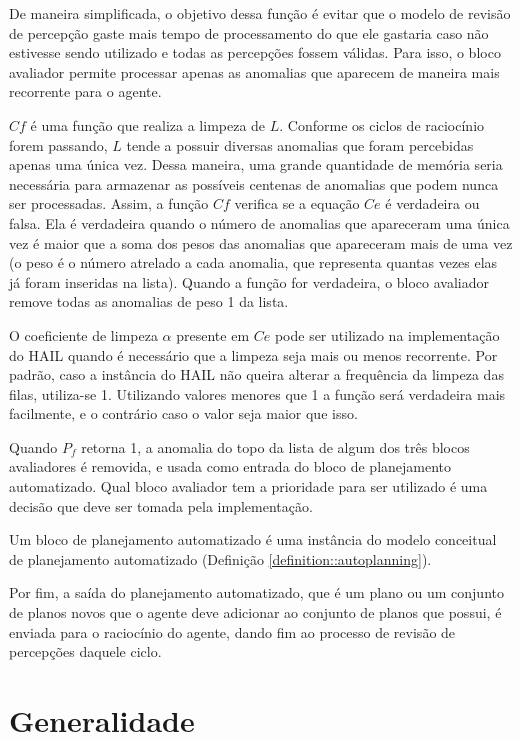 De maneira simplificada, o objetivo dessa função é evitar que o modelo de revisão de percepção gaste mais tempo de processamento do que ele gastaria caso não estivesse sendo utilizado e todas as percepções fossem válidas. Para isso, o bloco avaliador permite processar apenas as anomalias que aparecem de maneira mais recorrente para o agente.

$Cf$ é uma função que realiza a limpeza de $L$. Conforme os ciclos de raciocínio forem passando, $L$ tende a possuir diversas anomalias que foram percebidas apenas uma única vez. Dessa maneira, uma grande quantidade de memória seria necessária para armazenar as possíveis centenas de anomalias que podem nunca ser processadas. Assim, a função $Cf$ verifica se a equação $Ce$ é verdadeira ou falsa. Ela é verdadeira quando o número de anomalias que apareceram uma única vez é maior que a soma dos pesos das anomalias que apareceram mais de uma vez (o peso é o número atrelado a cada anomalia, que representa quantas vezes elas já foram inseridas na lista). Quando a função for verdadeira, o bloco avaliador remove todas as anomalias de peso 1 da lista.

O coeficiente de limpeza $\alpha$ presente em $Ce$ pode ser utilizado na implementação do HAIL quando é necessário que a limpeza seja mais ou menos recorrente. Por padrão, caso a instância do HAIL não queira alterar a frequência da limpeza das filas, utiliza-se 1. Utilizando valores menores que 1 a função será verdadeira mais facilmente, e o contrário caso o valor seja maior que isso.

Quando $P_f$ retorna 1, a anomalia do topo da lista de algum dos três blocos avaliadores é removida, e usada como entrada do bloco de planejamento automatizado. Qual bloco avaliador tem a prioridade para ser utilizado é uma decisão que deve ser tomada pela implementação.

\begin{definition}
    Um bloco de planejamento automatizado é uma instância do modelo conceitual de planejamento automatizado (Definição \ref{definition::autoplanning}).
\end{definition}

Por fim, a saída do planejamento automatizado, que é um plano ou um conjunto de planos novos que o agente deve adicionar ao conjunto de planos que possui, é enviada para o raciocínio do agente, dando fim ao processo de revisão de percepções daquele ciclo.

\section{Generalidade}

